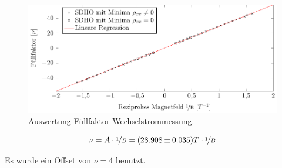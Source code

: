 \begin{figure}[h]
	\centering
	\includegraphics{graphs/ac/auswertung.pdf}
	\caption[Auswertung Füllfaktor Wechselstrommessung]{
		Auswertung Füllfaktor Wechselstrommessung.
	}
	\label{fig:ac_sdho_ausw}
\end{figure}

\begin{equation}
\nu= A\cdot \nicefrac{1}{B}=(28.908\pm 0.035)T \cdot \nicefrac{1}{B}
\end{equation}

Es wurde ein Offset von $\nu=4$ benutzt.
